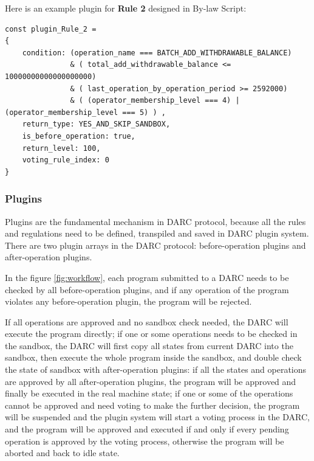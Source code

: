 \documentclass[main.tex]{subfiles}
\begin{document}
Here is an example plugin for \textbf{Rule 2} designed in By-law Script:

\begin{verbatim}
const plugin_Rule_2 = 
{
    condition: (operation_name === BATCH_ADD_WITHDRAWABLE_BALANCE)
               & ( total_add_withdrawable_balance <= 10000000000000000000)
               & ( last_operation_by_operation_period >= 2592000) 
               & ( (operator_membership_level === 4) | (operator_membership_level === 5) ) ,
    return_type: YES_AND_SKIP_SANDBOX,
    is_before_operation: true,
    return_level: 100,
    voting_rule_index: 0
}
\end{verbatim}

\subsubsection{Plugins}

Plugins are the fundamental mechanism in DARC protocol, because all the rules and regulations need to be defined, transpiled and saved in DARC plugin system. There are two plugin arrays in the DARC protocol: before-operation plugins and after-operation plugins.



In the figure \ref{fig:workflow}, each program submitted to a DARC needs to be checked by all before-operation plugins, and if any operation of the program violates any before-operation plugin, the program will be rejected. 

If all operations are approved and no sandbox check needed, the DARC will execute the program directly; if one or some operations needs to be checked in the sandbox, the DARC will first copy all states from current DARC into the sandbox, then execute the whole program inside the sandbox, and double check the state of sandbox with after-operation plugins: if all the states and operations are approved by all after-operation plugins, the program will be approved and finally be executed in the real machine state; if one or some of the operations cannot be approved and need voting to make the further decision, the program will be suspended and the plugin system will start a voting process in the DARC, and the program will be approved and executed if and only if every pending operation is approved by the voting process, otherwise the program will be aborted and back to idle state.
\end{document}

